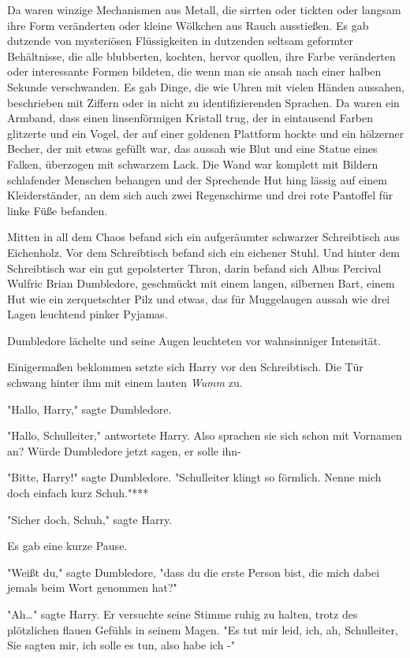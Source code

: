 {Da waren winzige Mechanismen aus Metall, die sirrten oder tickten oder langsam ihre Form veränderten oder kleine Wölkchen aus Rauch ausstießen. Es gab dutzende von mysteriösen Flüssigkeiten in dutzenden seltsam geformter Behältnisse, die alle blubberten, kochten, hervor quollen, ihre Farbe veränderten oder interessante Formen bildeten, die wenn man sie ansah nach einer halben Sekunde verschwanden. Es gab Dinge, die wie Uhren mit vielen Händen aussahen, beschrieben mit Ziffern oder in nicht zu identifizierenden Sprachen. Da waren ein Armband, dass einen linsenförmigen Kristall trug, der in eintausend Farben glitzerte und ein Vogel, der auf einer goldenen Plattform hockte und ein hölzerner Becher, der mit etwas gefüllt war, das aussah wie Blut und eine Statue eines Falken, überzogen mit schwarzem Lack. Die Wand war komplett mit Bildern schlafender Menschen behangen und der Sprechende Hut hing lässig auf einem Kleiderständer, an dem sich auch zwei Regenschirme und drei rote Pantoffel für linke Füße befanden.

Mitten in all dem Chaos befand sich ein aufgeräumter schwarzer Schreibtisch aus Eichenholz. Vor dem Schreibtisch befand sich ein eichener Stuhl. Und hinter dem Schreibtisch war ein gut gepolsterter Thron, darin befand sich Albus Percival Wulfric Brian Dumbledore, geschmückt mit einem langen, silbernen Bart, einem Hut wie ein zerquetschter Pilz und etwas, das für Muggelaugen aussah wie drei Lagen leuchtend pinker Pyjamas.

Dumbledore lächelte und seine Augen leuchteten vor wahnsinniger Intensität.

Einigermaßen beklommen setzte sich Harry vor den Schreibtisch. Die Tür schwang hinter ihm mit einem lauten \emph{Wumm} zu.

"Hallo, Harry," sagte Dumbledore.

"Hallo, Schulleiter," antwortete Harry. Also sprachen sie sich schon mit Vornamen an? Würde Dumbledore jetzt sagen, er solle ihn-

"Bitte, Harry!" sagte Dumbledore. "Schulleiter klingt so förmlich. Nenne mich doch einfach kurz Schuh."***

"Sicher doch, Schuh," sagte Harry.

Es gab eine kurze Pause.

"Weißt du," sagte Dumbledore, "dass du die erste Person bist, die mich dabei jemals beim Wort genommen hat?"

"Ah…" sagte Harry. Er versuchte seine Stimme ruhig zu halten, trotz des plötzlichen flauen Gefühls in seinem Magen. "Es tut mir leid, ich, ah, Schulleiter, Sie sagten mir, ich solle es tun, also habe ich -"

}
